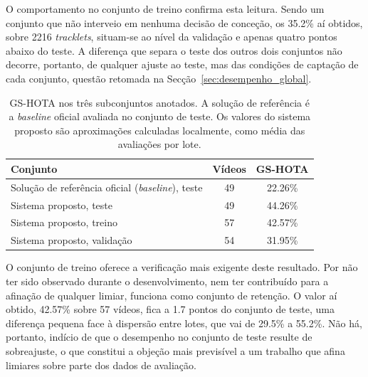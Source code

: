 
O comportamento no conjunto de treino confirma esta leitura. Sendo um conjunto que não
interveio em nenhuma decisão de conceção, os 35.2\% aí obtidos, sobre 2216
\emph{tracklets}, situam-se ao nível da validação e apenas quatro pontos abaixo do teste.
A diferença que separa o teste dos outros dois conjuntos não decorre, portanto, de
qualquer ajuste ao teste, mas das condições de captação de cada conjunto, questão
retomada na Secção~\ref{sec:desempenho_global}.



\begin{table}[htbp]
\centering
\caption{GS-HOTA nos três subconjuntos anotados. A solução de referência é a
\emph{baseline} oficial avaliada no conjunto de teste. Os valores do sistema proposto são
aproximações calculadas localmente, como média das avaliações por lote.}
\label{tab:gshota}
\begin{tabular}{lcc}
\hline
\textbf{Conjunto} & \textbf{Vídeos} & \textbf{GS-HOTA} \\
\hline
Solução de referência oficial (\emph{baseline}), teste & 49 & 22.26\% \\
\hline
Sistema proposto, teste      & 49 & 44.26\% \\
Sistema proposto, treino     & 57 & 42.57\% \\
Sistema proposto, validação  & 54 & 31.95\% \\
\hline
\end{tabular}
\end{table}



O conjunto de treino oferece a verificação mais exigente deste resultado. Por não ter
sido observado durante o desenvolvimento, nem ter contribuído para a afinação de qualquer
limiar, funciona como conjunto de retenção. O valor aí obtido, 42.57\% sobre 57 vídeos,
fica a 1.7 pontos do conjunto de teste, uma diferença pequena face à dispersão entre
lotes, que vai de 29.5\% a 55.2\%. Não há, portanto, indício de que o desempenho no
conjunto de teste resulte de sobreajuste, o que constitui a objeção mais previsível a um
trabalho que afina limiares sobre parte dos dados de avaliação.

